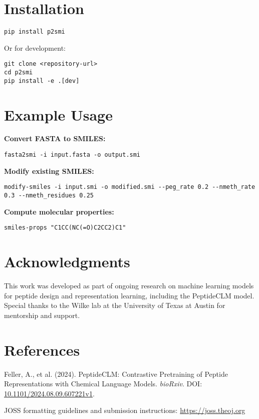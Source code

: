 \documentclass[10pt]{article}
\begin{document}
\section*{Installation}
\begin{verbatim}
pip install p2smi
\end{verbatim}
Or for development:
\begin{verbatim}
git clone <repository-url>
cd p2smi
pip install -e .[dev]
\end{verbatim}

\section*{Example Usage}
\textbf{Convert FASTA to SMILES:}
\begin{verbatim}
fasta2smi -i input.fasta -o output.smi
\end{verbatim}

\textbf{Modify existing SMILES:}
\begin{verbatim}
modify-smiles -i input.smi -o modified.smi --peg_rate 0.2 --nmeth_rate 0.3 --nmeth_residues 0.25
\end{verbatim}

\textbf{Compute molecular properties:}
\begin{verbatim}
smiles-props "C1CC(NC(=O)C2CC2)C1"
\end{verbatim}

\section*{Acknowledgments}
This work was developed as part of ongoing research on machine learning models for peptide design and representation learning, including the PeptideCLM model. Special thanks to the Wilke lab at the University of Texas at Austin for mentorship and support.

\section*{References}
\noindent
Feller, A., et al. (2024). PeptideCLM: Contrastive Pretraining of Peptide Representations with Chemical Language Models. \textit{bioRxiv}. DOI: \href{https://www.biorxiv.org/content/10.1101/2024.08.09.607221v1}{10.1101/2024.08.09.607221v1}.

\vspace{0.5cm}
\noindent
JOSS formatting guidelines and submission instructions: \url{https://joss.theoj.org}
\end{document}

